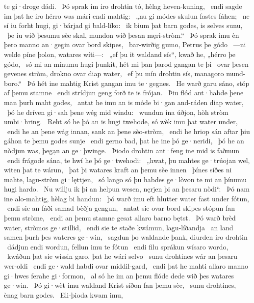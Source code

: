 te gi·droge dádi. \hld\ Þó sprak im iro drohtin tó,
hèlag heven-kuning, \hld\ endi sagde im þat he iro hérro was
mári endi mahtig: \hld\ „nu gi módes skulun
fastes fáhen; \hld\ ne sí iu forht hugi,
gi·bárjad gi bald-líko: \hld\ ik bium þat barn godes,
is selves sunu, \hld\ þe iu wið þesumu sèe skal,
mundon wið þesan męri-stròm.“ \hld\ Þó sprak imu èn þero manno an·gegin
ovar bord skipes, \hld\ bar-wirðig gumo,
Petrus þe gódo \hld\ —ni welde píne þolon,
watares wíti—: \hld\ „ef þu it waldand sís“, kwað he,
„hérro þe gódo, \hld\ só mi an mínumu hugi þunkit,
hét mi þan þarod gangan te þi \hld\ ovar þesen gevenes stròm,
drokno ovar diap water, \hld\ ef þu mín drohtin sís,
managoro mund-boro.“ \hld\ Þó hét ine mahtig Krist
gangan imu te·gegnes. \hld\ He warð garu sáno,
stóp af þemu stamne \hld\ endi strídjun geng
forð te is frójan. \hld\ Þiu flód ant·habde
þene man þurh maht godes, \hld\ antat he imu an is móde bi·gan
and-ráden diap water, \hld\ þó he dríven gi·sah
þene wég mid windu: \hld\ wundun ina úðjon,
hòh stròm umbi·hring. \hld\ Reht só he þó an is hugi twehode,
só wèk imu þat water under, \hld\ endi he an þene wág innan,
sank an þene sèo-stròm, \hld\ endi he hriop sán aftar þiu
gáhon te þemu godes sunje \hld\ endi gerno bad,
þat he ine þó ge·neridi, \hld\ þó he an nòdjun was,
þegạn an ge·þwinge. \hld\ Þiodo drohtin
ant·feng ine mid is faðmun \hld\ endi frágode sána,
te hwí he þó ge·twehodi: \hld\ „hwat, þu mahtes ge·trúojan wel,
witen þat te wárun, \hld\ þat þi watares kraft
an þemu sèe innen \hld\ þínes síðes ni mahte,
lagu-stròm gi·lęttjen, \hld\ só lango só þu habdes ge·lòvon te mi
an þínumu hugi hardo. \hld\ Nu willju ik þi an helpun wesen,
nęrjen þi an þesaru nòdi“. \hld\ Þó nam ine alo-mahtig,
hèlag bi handun: \hld\ þó warð imu eft hlutter water
fast under fótun, \hld\ endi sie an fáði samad
bèðja gengun, \hld\ antat sie ovar bord skipes
stópun fan þemu stròme, \hld\ endi an þemu stamne gesat
allaro barno bętst. \hld\ Þó warð brèd water,
stròmos ge·stillid, \hld\ endi sie te staðe kwámun,
lagu-líðandja \hld\ an land samen
þurh þes wateres ge·win, \hld\ sagdun þo waldande þank,
diurden iro drohtin \hld\ dádjun endi wordun,
fellun imu te fótun \hld\ endi filu sprákun
wísaro wordo, \hld\ kwáðun þat sie wissin garo,
þat he wári selvo \hld\ sunu drohtines
wár an þesaru wer-oldi \hld\ endi ge·wald habdi
ovar middil-gard, \hld\ endi þat he mahti allaro manno gi·hwes
ferahe gi·formon, \hld\ al só he im an þemu flóde dede
wið þes watares ge·win. \hld\ Þó gi·wèt imu waldand Krist
síðon fan þemu sèe, \hld\ sunu drohtines,
ènag barn godes. \hld\ Eli-þioda kwam imu,

